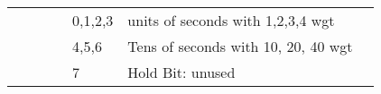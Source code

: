 \begin{landscape}
\begin{longtable}[c]{|l|l|l|l|l|l|l|l|l|}
		&                                         &                                                                                                 & \multirow{3}{*}{}                  & 0,1,2,3                                                                               & \multicolumn{3}{l|}{units of seconds with 1,2,3,4 wgt}                                                                                                                                                                                                            &                                                                                                                                                                                                                                           \\ \cline{5-8}
		&                                         &                                                                                                 &                                    & 4,5,6                                                                                 & \multicolumn{3}{l|}{Tens of seconds with 10, 20, 40 wgt}                                                                                                                                                                                                             &                                                                                                                                                                                                                                           \\ \cline{5-8}
		&                                         &                                                                                                 &                                    & 7                                                                                     & \multicolumn{3}{l|}{Hold Bit: unused}                                                                                                                                                                                                                    &                                                                                                                                                                                                                                           \\ \hline

\end{longtable}
\end{landscape}
